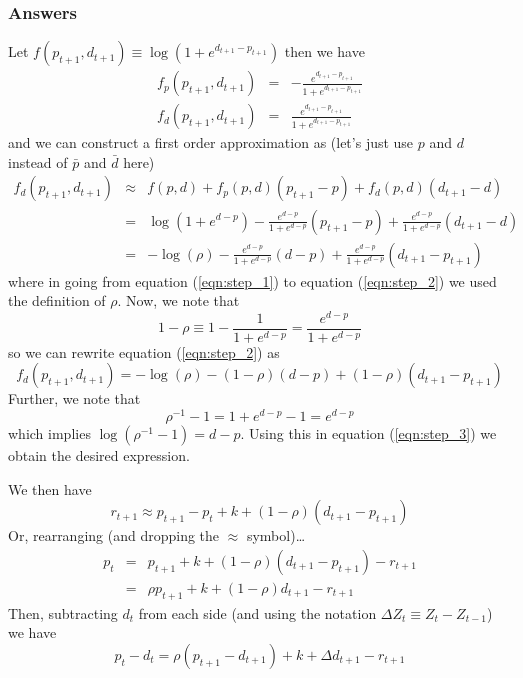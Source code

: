 \documentclass[authoryear,11pt]{elsarticle}
\begin{document}
\subsubsection*{Answers}
Let $f(p_{t+1},d_{t+1}) \equiv \log{(1+e^{d_{t+1}-p_{t+1}})}$ then we have
\begin{eqnarray*}
f_{p}(p_{t+1},d_{t+1}) &=& - \frac{e^{d_{t+1}-p_{t+1}}}{1+e^{d_{t+1}-p_{t+1}}}	\\
f_{d}(p_{t+1},d_{t+1}) &=& \frac{e^{d_{t+1}-p_{t+1}}}{1+e^{d_{t+1}-p_{t+1}}}
\end{eqnarray*}
and we can construct a first order approximation as (let's just use $p$ and $d$ instead of $\bar{p}$ and $\bar{d}$ here)
\begin{eqnarray}
f_{d}(p_{t+1},d_{t+1}) 	&\approx& 	f(p,d) + f_{p}(p,d)(p_{t+1}-p) + f_{d}(p,d)(d_{t+1}-d)	\nonumber \\
						&=&		\log{(1+e^{d-p})}- \frac{e^{d-p}}{1+e^{d-p}} (p_{t+1}-p) + \frac{e^{d-p}}{1+e^{d-p}} (d_{t+1}-d)	\label{eqn:step_1}\\
						&=&		-\log{(\rho)} - \frac{e^{d-p}}{1+e^{d-p}} (d-p) + \frac{e^{d-p}}{1+e^{d-p}} (d_{t+1}-p_{t+1}) \label{eqn:step_2}
\end{eqnarray}
where in going from equation (\ref{eqn:step_1}) to equation (\ref{eqn:step_2}) we used the definition of $\rho$. Now, we note that
\[
1-\rho \equiv 1 - \frac{1}{1+e^{d-p}} = \frac{e^{d-p}}{1+e^{d-p}}
\]
so we can rewrite equation (\ref{eqn:step_2}) as
\begin{equation}
f_{d}(p_{t+1},d_{t+1}) = -\log{(\rho)} - (1-\rho)(d-p) + (1-\rho)(d_{t+1}-p_{t+1}) \label{eqn:step_3}
\end{equation}
Further, we note that
\[
\rho^{-1} - 1 = 1+e^{d-p}-1 = e^{d-p}
\]
which implies $\log{(\rho^{-1} - 1)}=d-p$. Using this in equation (\ref{eqn:step_3}) we obtain the desired expression.

We then have
\[
r_{t+1} \approx p_{t+1} - p_{t} + k + (1-\rho)(d_{t+1} - p_{t+1})
\]
Or, rearranging (and dropping the $\approx$ symbol)\ldots
\begin{eqnarray*}
p_{t} 	&=& p_{t+1} + k + (1-\rho)(d_{t+1} - p_{t+1}) - r_{t+1} \\
		&=& \rho p_{t+1} + k + (1-\rho)d_{t+1} - r_{t+1}
\end{eqnarray*}
Then, subtracting $d_{t}$ from each side (and using the notation $\Delta Z_{t} \equiv Z_{t} - Z_{t-1}$) we have
\begin{equation}
p_{t}-d_{t} = \rho (p_{t+1}-d_{t+1}) + k + \Delta d_{t+1} - r_{t+1} \label{eqn:step_4}
\end{equation}
\end{document}
